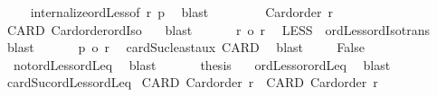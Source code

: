 \begin{isabellebody}
\ \ \ \isamarkupfalse%
\ internalize{\isacharunderscore}{\kern0pt}ordLess{\isacharbrackleft}{\kern0pt}of\ r{\isacharprime}{\kern0pt}\ {\isacharquery}{\kern0pt}p{\isacharbrackright}{\kern0pt}\ \isamarkupfalse%
\ blast\isanewline
\ \ \ \isanewline
\ \ \ \isamarkupfalse%
\ {\isachardoublequoteopen}Card{\isacharunderscore}{\kern0pt}order\ r{\isacharprime}{\kern0pt}{\isacharprime}{\kern0pt}{\isachardoublequoteclose}\ \isamarkupfalse%
\ CARD{\isacharprime}{\kern0pt}\ Card{\isacharunderscore}{\kern0pt}order{\isacharunderscore}{\kern0pt}ordIso{}\ {}\ \isamarkupfalse%
\ blast\isanewline
\ \ \ \isamarkupfalse%
\ \isamarkupfalse%
\ {\isachardoublequoteopen}r\ {\isacharless}{\kern0pt}o\ r{\isacharprime}{\kern0pt}{\isacharprime}{\kern0pt}{\isachardoublequoteclose}\ \isamarkupfalse%
\ LESS\ {}\ ordLess{\isacharunderscore}{\kern0pt}ordIso{\isacharunderscore}{\kern0pt}trans\ \isamarkupfalse%
\ blast\isanewline
\ \ \ \isamarkupfalse%
\ \isamarkupfalse%
\ {\isachardoublequoteopen}{\isacharquery}{\kern0pt}p\ {\isasymle}o\ r{\isacharprime}{\kern0pt}{\isacharprime}{\kern0pt}{\isachardoublequoteclose}\ \isamarkupfalse%
\ cardSuc{\isacharunderscore}{\kern0pt}least{\isacharunderscore}{\kern0pt}aux\ CARD\ \isamarkupfalse%
\ blast\isanewline
\ \ \ \isamarkupfalse%
\ False\ \isamarkupfalse%
\ {}\ not{\isacharunderscore}{\kern0pt}ordLess{\isacharunderscore}{\kern0pt}ordLeq\ \isamarkupfalse%
\ blast\isanewline
\ \ \isacommand{{\isacharbraceright}{\kern0pt}}\isamarkupfalse%
\isanewline
\ \ \isamarkupfalse%
\ {\isacharquery}{\kern0pt}thesis\ \isamarkupfalse%
\ {}\ ordLess{\isacharunderscore}{\kern0pt}or{\isacharunderscore}{\kern0pt}ordLeq\ \isamarkupfalse%
\ blast\isanewline
{}\isamarkupfalse%
%
\endisatagproof
{\isafoldproof}%
%
\isadelimproof
\isanewline
%
\endisadelimproof
\isanewline
{}\isamarkupfalse%
\ cardSuc{\isacharunderscore}{\kern0pt}ordLess{\isacharunderscore}{\kern0pt}ordLeq{\isacharcolon}{\kern0pt}\isanewline
{}\ CARD{\isacharcolon}{\kern0pt}\ {\isachardoublequoteopen}Card{\isacharunderscore}{\kern0pt}order\ r{\isachardoublequoteclose}\ \ CARD{\isacharprime}{\kern0pt}{\isacharcolon}{\kern0pt}\ {\isachardoublequoteopen}Card{\isacharunderscore}{\kern0pt}order\ r{\isacharprime}{\kern0pt}{\isachardoublequoteclose}\isanewline

\end{isabellebody}
